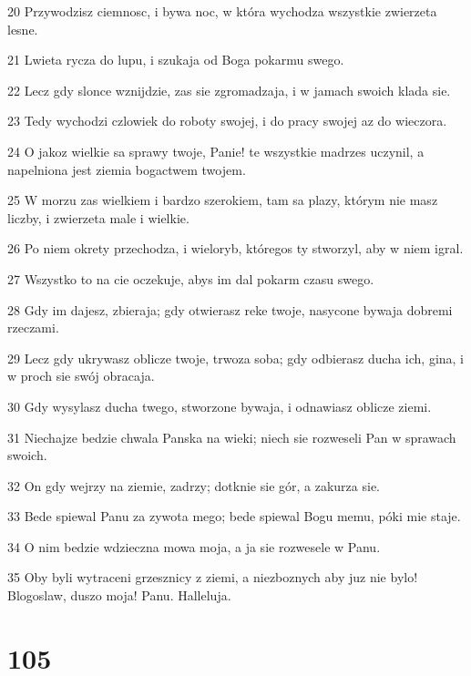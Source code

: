 \par 20 Przywodzisz ciemnosc, i bywa noc, w która wychodza wszystkie zwierzeta lesne.
\par 21 Lwieta rycza do lupu, i szukaja od Boga pokarmu swego.
\par 22 Lecz gdy slonce wznijdzie, zas sie zgromadzaja, i w jamach swoich klada sie.
\par 23 Tedy wychodzi czlowiek do roboty swojej, i do pracy swojej az do wieczora.
\par 24 O jakoz wielkie sa sprawy twoje, Panie! te wszystkie madrzes uczynil, a napelniona jest ziemia bogactwem twojem.
\par 25 W morzu zas wielkiem i bardzo szerokiem, tam sa plazy, którym nie masz liczby, i zwierzeta male i wielkie.
\par 26 Po niem okrety przechodza, i wieloryb, któregos ty stworzyl, aby w niem igral.
\par 27 Wszystko to na cie oczekuje, abys im dal pokarm czasu swego.
\par 28 Gdy im dajesz, zbieraja; gdy otwierasz reke twoje, nasycone bywaja dobremi rzeczami.
\par 29 Lecz gdy ukrywasz oblicze twoje, trwoza soba; gdy odbierasz ducha ich, gina, i w proch sie swój obracaja.
\par 30 Gdy wysylasz ducha twego, stworzone bywaja, i odnawiasz oblicze ziemi.
\par 31 Niechajze bedzie chwala Panska na wieki; niech sie rozweseli Pan w sprawach swoich.
\par 32 On gdy wejrzy na ziemie, zadrzy; dotknie sie gór, a zakurza sie.
\par 33 Bede spiewal Panu za zywota mego; bede spiewal Bogu memu, póki mie staje.
\par 34 O nim bedzie wdzieczna mowa moja, a ja sie rozwesele w Panu.
\par 35 Oby byli wytraceni grzesznicy z ziemi, a niezboznych aby juz nie bylo! Blogoslaw, duszo moja! Panu. Halleluja.

\chapter{105}

